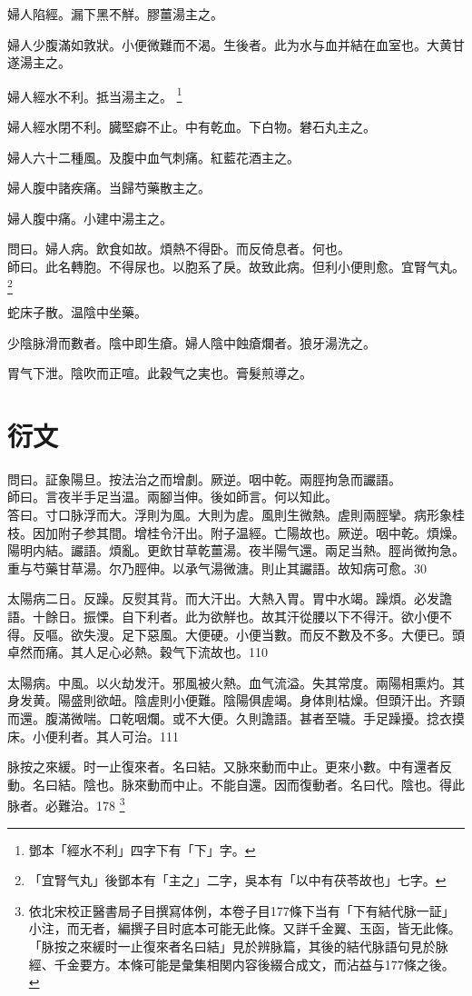 \documentclass[12pt,twoside,UTF8,b5paper]{ctexbook}
\begin{document}
婦人陷經。漏下黑不觧。膠薑湯主之。

婦人少腹滿如敦狀。小便微難而不渴。生後者。此为水与血并結在血室也。大黄甘遂湯主之。

婦人經水不利。抵当湯主之。
	\footnote{鄧本「經水不利」四字下有「下」字。}

婦人經水閉不利。臓堅癖不止。中有乾血。下白物。礬石丸主之。

婦人六十二種風。及腹中血气刺痛。紅藍花酒主之。

婦人腹中諸疾痛。当歸芍藥散主之。

婦人腹中痛。小建中湯主之。

問曰。婦人病。飲食如故。煩熱不得卧。而反倚息者。何也。\\
師曰。此名轉胞。不得尿也。以胞系了戾。故致此病。但利小便則愈。宜腎气丸。
	\footnote{「宜腎气丸」後鄧本有「主之」二字，吳本有「以中有茯苓故也」七字。}

蛇床子散。温陰中坐藥。

少陰脉滑而數者。陰中即生瘡。{婦人}陰中蝕瘡爛者。狼牙湯洗之。

胃气下泄。陰吹而正喧。此穀气之実也。膏髮煎導之。

\part{衍文}

問曰。証象陽旦。按法治之而增劇。厥逆。咽中乾。兩脛拘急而讝語。\\
師曰。言夜半手足当温。兩腳当伸。後如師言。何以知此。\\
答曰。寸口脉浮而大。浮{則}为風。大{則}为虗。風則生微熱。虗則兩脛攣。病形象桂枝。因加附子参其間。增桂令汗出。附子温經。亡陽故也。厥逆。咽中乾。煩燥。陽明内結。讝語。煩亂。更飲甘草乾薑湯。夜半陽气還。兩足当熱。脛尚微拘急。重与芍藥甘草湯。尔乃脛伸。以承气湯微溏。則止其讝語。故知病可愈。30

太陽病二日。反躁。反熨其背。而大汗出。大熱入胃。胃中水竭。躁煩。必发譫語。十餘日。振慄。自下利者。此为欲觧也。故其汗從腰以下不得汗。欲小便不得。反嘔。欲失溲。足下惡風。大便硬。小便当數。而反不數及不多。大便已。頭卓然而痛。其人足心必熱。穀气下流故也。110

太陽病。中風。以火劫发汗。邪風被火熱。血气流溢。失其常度。兩陽相熏灼。其身发黄。陽盛則欲衄。陰虗{則}小便難。陰陽俱虗竭。身体則枯燥。但頭汗出。齐頸而還。腹滿微喘。口乾咽爛。或不大便。久則譫語。甚者至噦。手足躁擾。捻衣摸床。小便利者。其人可治。111

脉按之來緩。时一止復來者。名曰結。又脉來動而中止。更來小數。中有還者反動。名曰結。陰也。脉來動而中止。不能自還。因而復動者。名曰代。陰也。得此脉者。必難治。178
\footnote{依北宋校正醫書局子目撰寫体例，本卷子目177條下当有「下有結代脉一証」小注，而无者，編撰子目时底本可能无此條。又詳千金翼、玉函，皆无此條。「脉按之來緩时一止復來者名曰結」見於辨脉篇，其後的結代脉語句見於脉經、千金要方。本條可能是彙集相関内容後綴合成文，而沾益与177條之後。}
\end{document}
